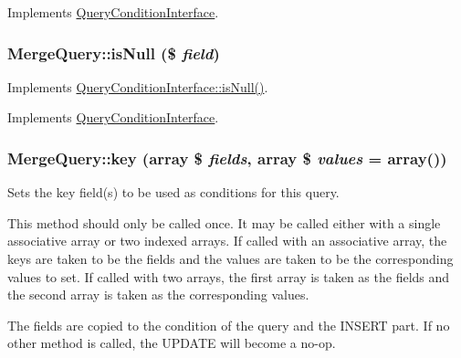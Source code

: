 Implements \hyperlink{interfaceQueryConditionInterface_a8bbb6acc9c72911b165cf6eb1dc31453}{QueryConditionInterface}.\hypertarget{classMergeQuery_a010c4f710e0e242d9d89383a49573376}{
\subsubsection[{isNull}]{\setlength{\rightskip}{0pt plus 5cm}MergeQuery::isNull (\$ {\em field})}}
\label{classMergeQuery_a010c4f710e0e242d9d89383a49573376}
Implements \hyperlink{interfaceQueryConditionInterface_a2978b536a3fe62b21e940366c9cb5923}{QueryConditionInterface::isNull()}. 

Implements \hyperlink{interfaceQueryConditionInterface_a2978b536a3fe62b21e940366c9cb5923}{QueryConditionInterface}.\hypertarget{classMergeQuery_aa34f8ac97b0571d49fbc20557dfce97b}{
\subsubsection[{key}]{\setlength{\rightskip}{0pt plus 5cm}MergeQuery::key (array \$ {\em fields}, \/  array \$ {\em values} = {\ttfamily array()})}}
\label{classMergeQuery_aa34f8ac97b0571d49fbc20557dfce97b}
Sets the key field(s) to be used as conditions for this query.

This method should only be called once. It may be called either with a single associative array or two indexed arrays. If called with an associative array, the keys are taken to be the fields and the values are taken to be the corresponding values to set. If called with two arrays, the first array is taken as the fields and the second array is taken as the corresponding values.

The fields are copied to the condition of the query and the INSERT part. If no other method is called, the UPDATE will become a no-\/op.


